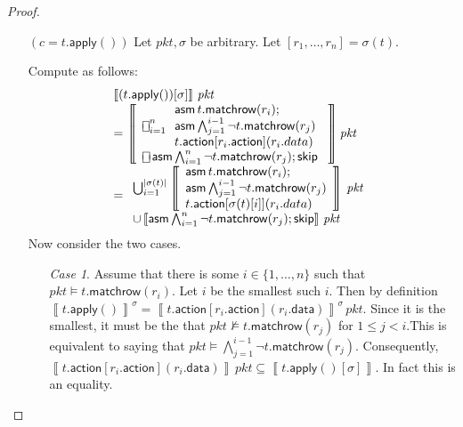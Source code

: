 \documentclass{article}
\newcommand{\pkt}{\mathit{pkt}}
\newcommand{\denote}[1]{\left\llbracket#1\right\rrbracket}
\newcommand{\action}{\mathsf{action}}
\newcommand{\data}{\mathsf{data}}
\newcommand{\assume}{\mathop{\mathsf{asm}}}
\newcommand{\apply}{\mathsf{apply}}
\newcommand{\choiceop}{\rotatebox[origin=c]{90}{$\sqsubset\!\!\!\sqsupset$}}
\newcommand{\choice}{\mathbin{\choiceop}}
\DeclareMathOperator*{\bigchoice}{\scalerel*{\choiceop}{\sum}}
\newcommand{\SKIP}{\mathsf{skip}}
\newcommand{\matchrow}{\mathsf{matchrow}}
\theoremstyle{plain}
\theoremstyle{definition}
\theoremstyle{remark}
\begin{document}
\begin{proof}
\begin{enumerate}[align=left]
    \item[$(c = t.\apply())$] Let $\pkt,\sigma$ be arbitrary. Let $[r_1, \ldots,
      r_n] = \sigma(t)$.

      Compute as follows:
      \[
      \begin{array}{ll}
        \denote{(t.\apply())[\sigma]}\,\pkt\\
        = \denote{
          \begin{array}{l}
            \bigchoice_{i=1}^{n}
            \begin{array}{l}
              \assume t.\matchrow(r_i);\\
              \assume \bigwedge_{j=1}^{i-1}\neg t.\matchrow(r_j)\\
              t.\action[r_i.\action](r_i.data)
            \end{array} \\
            \choice \assume \bigwedge_{i=1}^{n} \neg  t.\matchrow(r_j); \SKIP
        \end{array}}\pkt \\
        = \begin{array}{l}
          \bigcup_{i=1}^{|\sigma(t)|}
          \denote{
            \begin{array}{l}
              \assume t.\matchrow(r_i);\\
              \assume \bigwedge_{j=1}^{i-1}\neg t.\matchrow(r_j)\\
              t.\action[\sigma(t)[i]](r_i.data)
            \end{array}}\,\pkt\\
            \cup \denote{\assume \bigwedge_{i=1}^{n} \neg  t.\matchrow(r_j); \SKIP}\,\pkt
        \end{array} \\
        \end{array}
      \]
      Now consider the two cases.

      \begin{enumerate}
      \item[\textit{Case 1}.] Assume that there is some $i \in \{1,\ldots,
        n\}$ such that $\pkt \models t.\matchrow(r_i)$. Let $i$ be the
        smallest such $i$. Then by definition $\denote{t.\apply()}^\sigma =
        \denote{t.\action[r_i.\action](r_i.\data)}^\sigma\,\pkt$. Since it is
        the smallest, it must be the that $\pkt \not\models t.\matchrow(r_j)$
        for $1 \leq j < i$.This is equivalent to saying that $\pkt
        \models\bigwedge_{j=1}^{i-1}\neg t.\matchrow(r_j)$. Consequently,
        $\denote{t.\action[r_i.\action](r_i.\data)}\,\pkt \subseteq
        \denote{t.\apply()[\sigma]}$. In fact this is an equality.


\end{enumerate}
\end{enumerate}
\end{proof}
\end{document}
